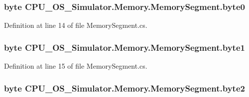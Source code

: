 \subsubsection[{byte0}]{\setlength{\rightskip}{0pt plus 5cm}byte C\+P\+U\+\_\+\+O\+S\+\_\+\+Simulator.\+Memory.\+Memory\+Segment.\+byte0\hspace{0.3cm}{\ttfamily [private]}}\label{class_c_p_u___o_s___simulator_1_1_memory_1_1_memory_segment_a97b8721f717e2fd03673d9dd96882ef8}


Definition at line 14 of file Memory\+Segment.\+cs.

\hypertarget{class_c_p_u___o_s___simulator_1_1_memory_1_1_memory_segment_aa64e7a88f9cdf5dbb5b0c846cc570a77}{}
\subsubsection[{byte1}]{\setlength{\rightskip}{0pt plus 5cm}byte C\+P\+U\+\_\+\+O\+S\+\_\+\+Simulator.\+Memory.\+Memory\+Segment.\+byte1\hspace{0.3cm}{\ttfamily [private]}}\label{class_c_p_u___o_s___simulator_1_1_memory_1_1_memory_segment_aa64e7a88f9cdf5dbb5b0c846cc570a77}


Definition at line 15 of file Memory\+Segment.\+cs.

\hypertarget{class_c_p_u___o_s___simulator_1_1_memory_1_1_memory_segment_a4f6ad3b2d132bfc1c4bd16d8fcca8d56}{}
\subsubsection[{byte2}]{\setlength{\rightskip}{0pt plus 5cm}byte C\+P\+U\+\_\+\+O\+S\+\_\+\+Simulator.\+Memory.\+Memory\+Segment.\+byte2\hspace{0.3cm}{\ttfamily [private]}}\label{class_c_p_u___o_s___simulator_1_1_memory_1_1_memory_segment_a4f6ad3b2d132bfc1c4bd16d8fcca8d56}


